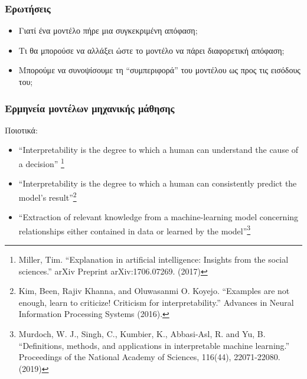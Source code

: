 \begin{frame}
  \frametitle{Ερωτήσεις}
  \begin{itemize}
  \item Γιατί ένα μοντέλο πήρε μια συγκεκριμένη απόφαση;
  \item Τι θα μπορούσε να αλλάξει ώστε το μοντέλο να πάρει διαφορετική απόφαση;
  \item Μπορούμε να συνοψίσουμε τη ``συμπεριφορά'' του μοντέλου ως προς τις
    εισόδους του;
  \end{itemize}
\end{frame}

\begin{frame}
  \frametitle{Ερμηνεία μοντέλων μηχανικής μάθησης}
  Ποιοτικά:
  \begin{itemize}
  \item ``Interpretability is the degree to which a human can understand the
    cause of a decision'' \footnote{Miller, Tim. ``Explanation in artificial
    intelligence: Insights from the social sciences.'' arXiv Preprint
    arXiv:1706.07269. (2017)}
  \item ``Interpretability is the degree to which a human can consistently
    predict the model’s result''\footnote{Kim, Been, Rajiv Khanna, and
    Oluwasanmi O. Koyejo. ``Examples are not enough, learn to criticize!
    Criticism for interpretability.'' Advances in Neural Information Processing
    Systems (2016).} 
  \item ``Extraction of relevant knowledge from a machine-learning model
    concerning relationships either contained in data or learned by the
    model''\footnote{Murdoch, W. J., Singh, C., Kumbier, K., Abbasi-Asl, R. and
    Yu, B. ``Definitions, methods, and applications in interpretable machine
    learning.'' Proceedings of the National Academy of Sciences, 116(44),
    22071-22080. (2019)} 
  \end{itemize}
\end{frame}


